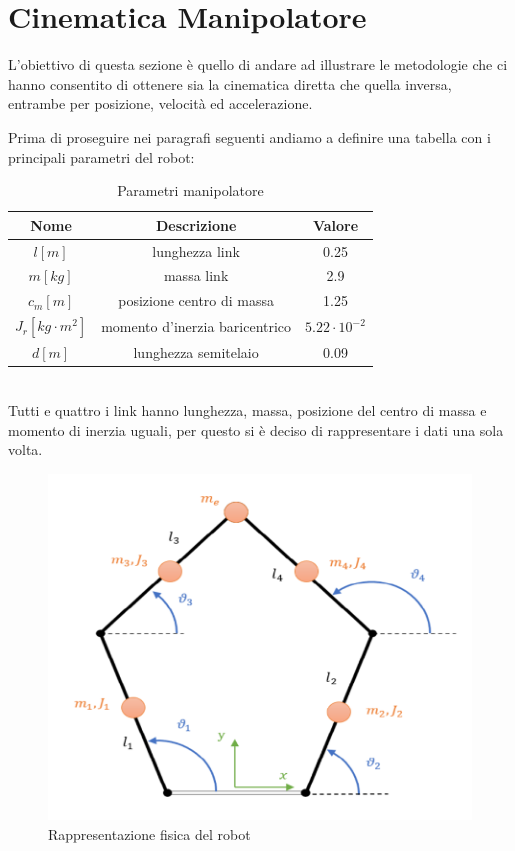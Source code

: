 \section{Cinematica Manipolatore}
L'obiettivo di questa sezione è quello di andare ad illustrare le metodologie che ci hanno consentito di ottenere sia la cinematica diretta che quella inversa, entrambe per posizione, velocità ed accelerazione.
\par Prima di proseguire nei paragrafi seguenti andiamo a definire una tabella con i principali parametri del robot:
\begin{table}[h!]
\centering
\begin{tabular}{|c |c |c|} 
 \hline
 Nome & Descrizione  & Valore \\ [0.5ex] 
 \hline\hline
 $l [m]$ & lunghezza link  & 0.25 \\ 
 $m [kg]$ & massa link & 2.9 \\
 $c_m [m]$ & posizione centro di massa & 1.25 \\
 $J_r [kg\cdot m^2]$ & momento d'inerzia baricentrico & $5.22\cdot 10^{-2}$ \\
 $d [m]$ & lunghezza semitelaio & 0.09 \\
 \hline
\end{tabular}
\caption{Parametri manipolatore}
\label{table:1}
\end{table}
\\Tutti e quattro i link hanno lunghezza, massa, posizione del centro di massa e momento di inerzia uguali, per questo si è deciso di rappresentare i dati una sola volta.
\begin{figure}[ht]
\begin{center}
    \includegraphics[scale=0.6]{Immagini/Robot2.png}
    \caption{Rappresentazione fisica del robot \label{fig:Robot1}}
\end{center}
\end{figure}
